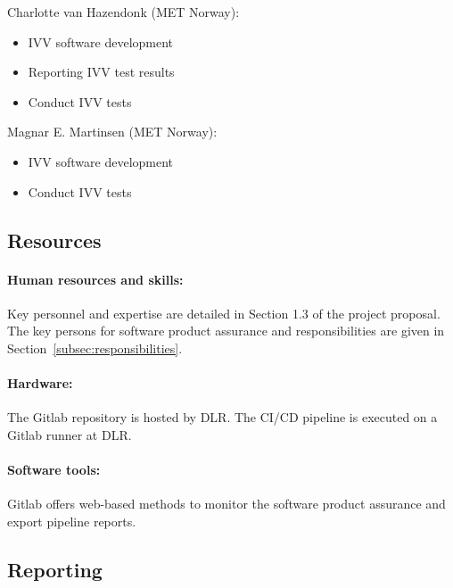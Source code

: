 \noindent Charlotte van Hazendonk (MET Norway):
\begin{itemize}
    \item IVV software development 
    \item Reporting IVV test results
    \item Conduct IVV tests
\end{itemize}

\noindent Magnar E. Martinsen (MET Norway):
\begin{itemize}
    \item IVV software development
    \item Conduct IVV tests
\end{itemize}

\subsection{Resources}
\label{subsec:resources}


\paragraph*{Human resources and skills:} Key personnel and expertise are detailed in Section 1.3 of the project proposal. The key persons for software product assurance and responsibilities are given in Section~\ref{subsec:responsibilities}.

\paragraph*{Hardware:} The Gitlab repository is hosted by DLR. The CI/CD pipeline is executed on a Gitlab runner at DLR. 

\paragraph*{Software tools:} Gitlab offers web-based methods to monitor the software product assurance and export pipeline reports.

\subsection{Reporting}
\label{subsec:reporting}

